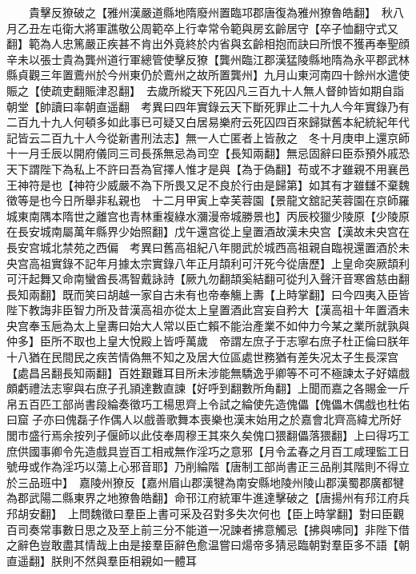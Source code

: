 　　貴擊反獠破之【雅州漢嚴道縣地隋廢州置臨邛郡唐復為雅州獠魯皓翻】　秋八月乙丑左屯衛大將軍譙敬公周範卒上行幸常令範與房玄齡居守【卒子恤翻守式又翻】範為人忠篤嚴正疾甚不肯出外竟終於内省與玄齡相抱而訣曰所恨不獲再奉聖顔　辛未以張士貴為龔州道行軍總管使擊反獠【龔州臨江郡漢猛陵縣地隋為永平郡武林縣貞觀三年置鷰州於今州東仍於鷰州之故所置龔州】九月山東河南四十餘州水遣使賑之【使疏吏翻賑津忍翻】　去歲所縱天下死囚凡三百九十人無人督帥皆如期自詣朝堂【帥讀曰率朝直遥翻　考異曰四年實錄云天下斷死罪止二十九人今年實錄乃有二百九十九人何頓多如此事已可疑又白居易樂府云死囚四百來歸獄舊本紀統紀年代記皆云二百九十人今從新書刑法志】無一人亡匿者上皆赦之　冬十月庚申上還京師　十一月壬辰以開府儀同三司長孫無忌為司空【長知兩翻】無忌固辭曰臣忝預外戚恐天下謂陛下為私上不許曰吾為官擇人惟才是與【為于偽翻】苟或不才雖親不用襄邑王神符是也【神符少威嚴不為下所畏又足不良於行由是歸第】如其有才雖讎不棄魏徵等是也今日所舉非私親也　十二月甲寅上幸芙蓉園【景龍文舘記芙蓉園在京師羅城東南隅本隋世之離宫也青林重複綠水瀰漫帝城勝景也】丙辰校獵少陵原【少陵原在長安城南屬萬年縣界少始照翻】戊午還宫從上皇置酒故漢未央宫【漢故未央宫在長安宫城北禁苑之西偏　考異曰舊高祖紀八年閱武於城西高祖親自臨視還置酒於未央宫高祖實錄不記年月據太宗實錄八年正月頡利可汗死今從唐歷】上皇命突厥頡利可汗起舞又命南蠻酋長馮智戴詠詩【厥九勿翻頡奚結翻可從刋入聲汗音寒酋慈由翻長知兩翻】既而笑曰胡越一家自古未有也帝奉觴上夀【上時掌翻】曰今四夷入臣皆陛下教誨非臣智力所及昔漢高祖亦從太上皇置酒此宫妄自矜大【漢高祖十年置酒未央宫奉玉巵為太上皇夀曰始大人常以臣亡賴不能治產業不如仲力今某之業所就孰與仲多】臣所不取也上皇大悅殿上皆呼萬歲　帝謂左庶子于志寧右庶子杜正倫曰朕年十八猶在民間民之疾苦情偽無不知之及居大位區處世務猶有差失况太子生長深宫【處昌呂翻長知兩翻】百姓艱難耳目所未涉能無驕逸乎卿等不可不極諫太子好嬉戲頗虧禮法志寧與右庶子孔頴達數直諫【好呼到翻數所角翻】上聞而嘉之各賜金一斤帛五百匹工部尚書段綸奏徵巧工楊思齊上令試之綸使先造傀儡【傀儡木偶戲也杜佑曰窟子亦曰傀磊子作偶人以戲善歌舞本喪樂也漢末始用之於嘉會北齊高緯尤所好閭市盛行焉余按列子偃師以此伎奉周穆王其來久矣傀口猥翻儡落猥翻】上曰得巧工庶供國事卿令先造戲具豈百工相戒無作淫巧之意邪【月令孟春之月百工咸理監工日號毋或作為淫巧以蕩上心邪音耶】乃削綸階【唐制工部尚書正三品削其階則不得立於三品班中】　嘉陵州獠反【嘉州眉山郡漢犍為南安縣地陵州陵山郡漢蜀郡廣都犍為郡武陽二縣東界之地獠魯皓翻】命邗江府統軍牛進達擊破之【唐揚州有䢴江府兵䢴胡安翻】　上問魏徵曰羣臣上書可采及召對多失次何也【臣上時掌翻】對曰臣觀百司奏常事數日思之及至上前三分不能道一况諫者拂意觸忌【拂與咈同】非陛下借之辭色豈敢盡其情哉上由是接羣臣辭色愈温嘗曰煬帝多猜忌臨朝對羣臣多不語【朝直遥翻】朕則不然與羣臣相親如一體耳

